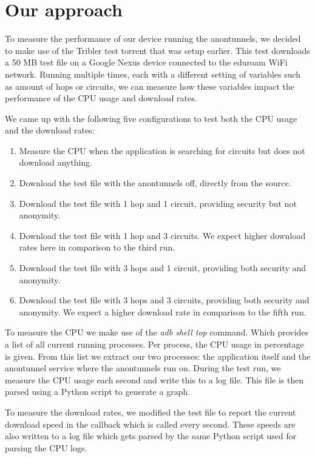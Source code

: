 % 
\section{Our approach}
	\label{sec:approach}
	To measure the performance of our device running the anontunnels, we decided to make use of the Tribler test torrent that was setup earlier. This test downloads a 50 MB test file on a Google Nexus device connected to the eduroam WiFi network. Running multiple times, each with a different setting of variables such as amount of hops or circuits, we can measure how these variables impact the performance of the CPU usage and download rates.
	
	We came up with the following five configurations to test both the CPU usage and the download rates:
	
	\begin{enumerate}
		\item Measure the CPU when the application is searching for circuits but does not download anything.
		\item Download the test file with the anontunnels off, directly from the source.
		\item Download the test file with 1 hop and 1 circuit, providing security but not anonymity.
		\item Download the test file with 1 hop and 3 circuits. We expect higher download rates here in comparison to the third run.
		\item Download the test file with 3 hops and 1 circuit, providing both security and anonymity.
		\item Download the test file with 3 hops and 3 circuits, providing both security and anonymity. We expect a higher download rate in comparison to the fifth run.
	\end{enumerate}
	
	To measure the CPU we make use of the \emph{adb shell top} command. Which provides a list of all current running processes. Per process, the CPU usage in percentage is given. From this list we extract our two processes: the application itself  and the anontunnel service where the anontunnels run on. During the test run, we measure the CPU usage each second and write this to a log file. This file is then parsed using a Python script to generate a graph.
	
	To measure the download rates, we modified the test file to report the current download speed in the callback which is called every second. These speeds are also written to a log file which gets parsed by the same Python script used for parsing the CPU logs.